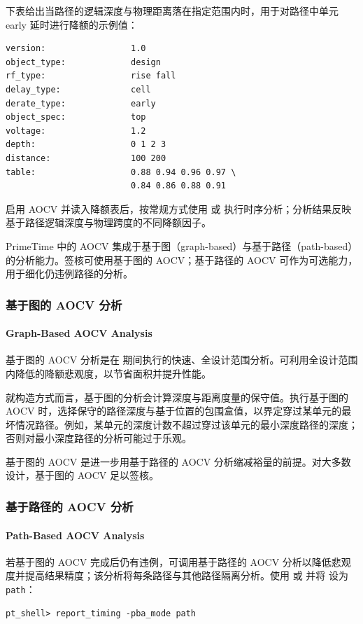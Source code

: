 下表给出当路径的逻辑深度与物理距离落在指定范围内时，用于对路径中单元 early 延时进行降额的示例值：
\begin{lstlisting}
version:                 1.0
object_type:             design
rf_type:                 rise fall
delay_type:              cell
derate_type:             early
object_spec:             top
voltage:                 1.2
depth:                   0 1 2 3
distance:                100 200
table:                   0.88 0.94 0.96 0.97 \
                         0.84 0.86 0.88 0.91
\end{lstlisting}

启用 AOCV 并读入降额表后，按常规方式使用  或  执行时序分析；分析结果反映基于路径逻辑深度与物理跨度的不同降额因子。

PrimeTime 中的 AOCV 集成于基于图（graph-based）与基于路径（path-based）的分析能力。签核可使用基于图的 AOCV；基于路径的 AOCV 可作为可选能力，用于细化仍违例路径的分析。

\subsubsection{基于图的 AOCV 分析}
\paragraph*{Graph-Based AOCV Analysis}

基于图的 AOCV 分析是在  期间执行的快速、全设计范围分析。可利用全设计范围内降低的降额悲观度，以节省面积并提升性能。

就构造方式而言，基于图的分析会计算深度与距离度量的保守值。执行基于图的 AOCV 时，选择保守的路径深度与基于位置的包围盒值，以界定穿过某单元的最坏情况路径。例如，某单元的深度计数不超过穿过该单元的最小深度路径的深度；否则对最小深度路径的分析可能过于乐观。

基于图的 AOCV 是进一步用基于路径的 AOCV 分析缩减裕量的前提。对大多数设计，基于图的 AOCV 足以签核。

\subsubsection{基于路径的 AOCV 分析}
\paragraph*{Path-Based AOCV Analysis}

若基于图的 AOCV 完成后仍有违例，可调用基于路径的 AOCV 分析以降低悲观度并提高结果精度；该分析将每条路径与其他路径隔离分析。使用  或  并将  设为 \texttt{path}：
\begin{lstlisting}
pt_shell> report_timing -pba_mode path
\end{lstlisting}

